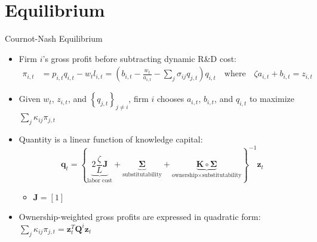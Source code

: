 \documentclass[
  aspectratio=169,  %
]{beamer}
\theoremstyle{plain}
\begin{document}
\section{Equilibrium}

\begin{frame}{Cournot-Nash Equilibrium}
  \begin{itemize}
    \item \label{cournot}Firm $i$'s gross profit before subtracting dynamic
          R\&D cost:
          \begin{align*}
            \pi_{i,t} & =p_{i,t}q_{i,t}-w_{t}l_{i,t}=\left(b_{i,t}-\frac{w_{t}}{a_{i,t}}-\sum_{j}\sigma_{ij}q_{j,t}\right)q_{i,t}\quad\text{where}\quad\zeta a_{i,t}+b_{i,t}=z_{i,t}
          \end{align*}
    \item Given $w_{t}$, $z_{i,t}$, and $\left\{ q_{j,t}\right\} _{j\neq i}$,
          firm $i$ chooses $a_{i,t}$, $b_{i,t}$, and $q_{i,t}$ to maximize
          $\sum_{j}\kappa_{ij}\pi_{j,t}$\pause\medskip{}
    \item Quantity is a linear function of knowledge capital:
          \[
            \symbf{q}_{t}=\left\{ \underbrace{2\frac{\zeta}{L}\symbf{J}}_{\text{labor cost}}+\underbrace{\symbf{\Sigma}}_{\text{substitutability}}+\underbrace{\symbf{K}\circ\symbf{\Sigma}}_{\text{ownership}\times\text{substitutability}}\right\} ^{-1}\symbf{z}_{t}
          \]

          \begin{itemize}
            \item $\symbf{J}=[1]$ \medskip{}
          \end{itemize}
    \item Ownership-weighted gross profits are expressed in quadratic form:
          $\sum_{j}\kappa_{ij}\pi_{j,t}=\symbf{z}_{t}^{T}\symbf{Q}^{i}\symbf{z}_{t}$
          \hyperlink{Q}{}
  \end{itemize}
\end{frame}
%
\end{document}
